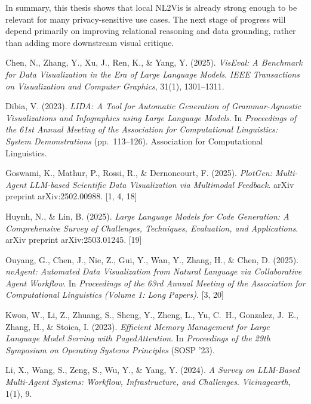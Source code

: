 \documentclass[a4paper,oneside,bibliography=totoc]{scrbook}
\begin{document}
In summary, this thesis shows that local NL2Vis is already strong enough to be relevant for many privacy-sensitive use cases. The next stage of progress will depend primarily on improving relational reasoning and data grounding, rather than adding more downstream visual critique.

\begin{thebibliography}{}

  Chen, N., Zhang, Y., Xu, J., Ren, K., \& Yang, Y. (2025).
  \textit{VisEval: A Benchmark for Data Visualization in the Era of Large Language Models}.
  \textit{IEEE Transactions on Visualization and Computer Graphics}, 31(1), 1301--1311.

  Dibia, V. (2023).
  \textit{LIDA: A Tool for Automatic Generation of Grammar-Agnostic Visualizations and Infographics using Large Language Models}.
  In \textit{Proceedings of the 61st Annual Meeting of the Association for Computational Linguistics: System Demonstrations} (pp.\ 113--126). Association for Computational Linguistics.

  Goswami, K., Mathur, P., Rossi, R., \& Dernoncourt, F. (2025).
  \textit{PlotGen: Multi-Agent LLM-based Scientific Data Visualization via Multimodal Feedback}.
  arXiv preprint arXiv:2502.00988. [1, 4, 18]

  Huynh, N., \& Lin, B. (2025).
  \textit{Large Language Models for Code Generation: A Comprehensive Survey of Challenges, Techniques, Evaluation, and Applications}.
  arXiv preprint arXiv:2503.01245. [19]

  Ouyang, G., Chen, J., Nie, Z., Gui, Y., Wan, Y., Zhang, H., \& Chen, D. (2025).
  \textit{nvAgent: Automated Data Visualization from Natural Language via Collaborative Agent Workflow}.
  In \textit{Proceedings of the 63rd Annual Meeting of the Association for Computational Linguistics (Volume 1: Long Papers)}. [3, 20]

  Kwon, W., Li, Z., Zhuang, S., Sheng, Y., Zheng, L., Yu, C.~H., Gonzalez, J.~E., Zhang, H., \& Stoica, I. (2023).
  \textit{Efficient Memory Management for Large Language Model Serving with PagedAttention}.
  In \textit{Proceedings of the 29th Symposium on Operating Systems Principles} (SOSP '23).

  Li, X., Wang, S., Zeng, S., Wu, Y., \& Yang, Y. (2024).
  \textit{A Survey on LLM-Based Multi-Agent Systems: Workflow, Infrastructure, and Challenges}.
  \textit{Vicinagearth}, 1(1), 9.


\end{thebibliography}
\end{document}
